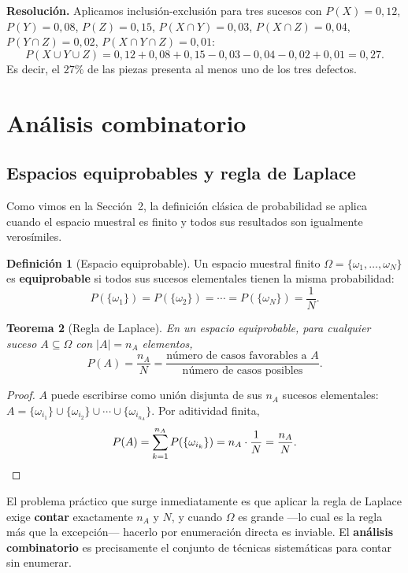 \documentclass[11pt,a4paper]{article}
\theoremstyle{plain}
\newtheorem{teorema}{Teorema}[section]
\theoremstyle{definition}
\newtheorem{definicion}[teorema]{Definición}
\theoremstyle{remark}
\begin{document}
\textbf{Resolución.} Aplicamos inclusión-exclusión para tres sucesos con $P(X)=0{,}12$, $P(Y)=0{,}08$, $P(Z)=0{,}15$, $P(X\cap Y)=0{,}03$, $P(X\cap Z)=0{,}04$, $P(Y\cap Z)=0{,}02$, $P(X\cap Y\cap Z)=0{,}01$:
\[
P(X\cup Y\cup Z) = 0{,}12+0{,}08+0{,}15 - 0{,}03-0{,}04-0{,}02 + 0{,}01 = 0{,}27.
\]
Es decir, el $27\%$ de las piezas presenta al menos uno de los tres defectos.

\newpage
\section{Análisis combinatorio}

\subsection{Espacios equiprobables y regla de Laplace}

Como vimos en la Sección~2, la definición clásica de probabilidad se aplica cuando el espacio muestral es finito y todos sus resultados son igualmente verosímiles.

\begin{definicion}[Espacio equiprobable]
Un espacio muestral finito $\Omega=\{\omega_1,\dots,\omega_N\}$ es \textbf{equiprobable} si todos sus sucesos elementales tienen la misma probabilidad:
\[
P(\{\omega_1\}) = P(\{\omega_2\}) = \cdots = P(\{\omega_N\}) = \frac{1}{N}.
\]
\end{definicion}

\begin{teorema}[Regla de Laplace]
En un espacio equiprobable, para cualquier suceso $A\subseteq\Omega$ con $|A|=n_A$ elementos,
\[
P(A) = \frac{n_A}{N} = \frac{\text{número de casos favorables a } A}{\text{número de casos posibles}}.
\]
\end{teorema}

\begin{proof}
$A$ puede escribirse como unión disjunta de sus $n_A$ sucesos elementales: $A = \{\omega_{i_1}\} \cup \{\omega_{i_2}\} \cup \cdots \cup \{\omega_{i_{n_A}}\}$. Por aditividad finita,
\[
P(A) = \sum_{k=1}^{n_A} P(\{\omega_{i_k}\}) = n_A \cdot \frac{1}{N} = \frac{n_A}{N}. \qedhere
\]
\end{proof}

El problema práctico que surge inmediatamente es que aplicar la regla de Laplace exige \textbf{contar} exactamente $n_A$ y $N$, y cuando $\Omega$ es grande —lo cual es la regla más que la excepción— hacerlo por enumeración directa es inviable. El \textbf{análisis combinatorio} es precisamente el conjunto de técnicas sistemáticas para contar sin enumerar.
\end{document}
